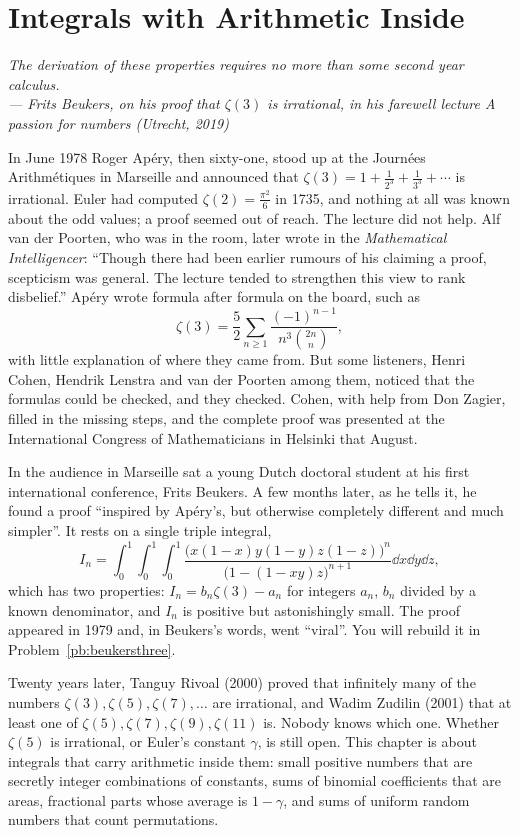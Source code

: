 \chapter{Integrals with Arithmetic Inside}

\begin{center}\itshape
The derivation of these properties requires no more than some second year calculus.\\
\upshape --- Frits Beukers, on his proof that $\zeta(3)$ is irrational, in his farewell lecture \emph{A passion for numbers} (Utrecht, 2019)
\end{center}

In June 1978 Roger Apéry, then sixty-one, stood up at the Journées Arithmétiques in Marseille and announced that
$\zeta(3)=1+\frac1{2^3}+\frac1{3^3}+\cdots$ is irrational. Euler had computed $\zeta(2)=\frac{\pi^2}6$ in 1735, and nothing at all was known
about the odd values; a proof seemed out of reach. The lecture did not help. Alf van der Poorten, who was in the room, later
wrote in the \emph{Mathematical Intelligencer}: ``Though there had been earlier rumours of his claiming a proof, scepticism was
general. The lecture tended to strengthen this view to rank disbelief.'' Apéry wrote formula after formula on the board, such as
\[
\zeta(3)=\frac52\sum_{n\ge1}\frac{(-1)^{n-1}}{n^3\binom{2n}n},
\]
with little explanation of where they came from. But some listeners, Henri Cohen, Hendrik Lenstra and van der Poorten among them,
noticed that the formulas could be checked, and they checked. Cohen, with help from Don Zagier, filled in the missing steps, and
the complete proof was presented at the International Congress of Mathematicians in Helsinki that August.

In the audience in Marseille sat a young Dutch doctoral student at his first international conference, Frits Beukers. A few months
later, as he tells it, he found a proof ``inspired by Apéry's, but otherwise completely different and much simpler''. It rests on a
single triple integral,
\[
I_n=\int_0^1\!\!\int_0^1\!\!\int_0^1\frac{\bigl(x(1-x)y(1-y)z(1-z)\bigr)^n}{\bigl(1-(1-xy)z\bigr)^{n+1}}\dd x\dd y\dd z,
\]
which has two properties: $I_n=b_n\zeta(3)-a_n$ for integers $a_n$, $b_n$ divided by a known denominator, and $I_n$ is positive but
astonishingly small. The proof appeared in 1979 and, in Beukers's words, went ``viral''. You will rebuild it in
Problem~\ref{pb:beukersthree}.

Twenty years later, Tanguy Rivoal (2000) proved that infinitely many of the numbers $\zeta(3),\zeta(5),\zeta(7),\dots$ are irrational,
and Wadim Zudilin (2001) that at least one of $\zeta(5),\zeta(7),\zeta(9),\zeta(11)$ is. Nobody knows which one. Whether $\zeta(5)$ is
irrational, or Euler's constant $\gamma$, is still open. This chapter is about integrals that carry arithmetic inside them: small
positive numbers that are secretly integer combinations of constants, sums of binomial coefficients that are areas, fractional
parts whose average is $1-\gamma$, and sums of uniform random numbers that count permutations.

